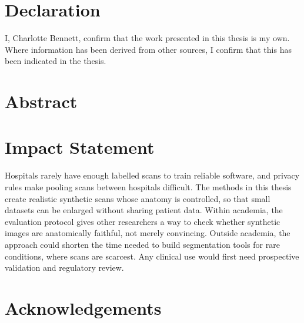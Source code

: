 \documentclass[12pt,oneside,a4paper]{report}
\begin{document}

\setcounter{page}{2}

\chapter*{Declaration}
I, Charlotte Bennett, confirm that the work presented in this thesis is my own. Where
information has been derived from other sources, I confirm that this has been indicated in the
thesis.
\clearpage
\chapter*{Abstract}

\clearpage
\chapter*{Impact Statement}
Hospitals rarely have enough labelled scans to train reliable software, and privacy rules make
pooling scans between hospitals difficult. The methods in this thesis create realistic
synthetic scans whose anatomy is controlled, so that small datasets can be enlarged without
sharing patient data. Within academia, the evaluation protocol gives other researchers a way to
check whether synthetic images are anatomically faithful, not merely convincing. Outside
academia, the approach could shorten the time needed to build segmentation tools for rare
conditions, where scans are scarcest. Any clinical use would first need prospective validation
and regulatory review.
\clearpage
\chapter*{Acknowledgements}

\clearpage
\tableofcontents
\listoffigures
\listoftables
\clearpage







\appendix




\end{document}

